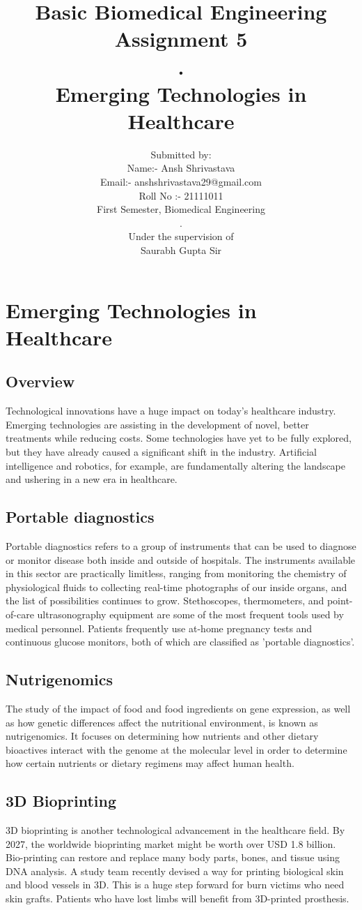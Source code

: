 \documentclass[12pt]{article}
\title{Basic Biomedical Engineering\\Assignment 5\\.\\Emerging Technologies in Healthcare}
\author{Submitted by: \\Name:- Ansh Shrivastava\\Email:- anshshrivastava29@gmail.com\\Roll No :- 21111011\\First Semester, Biomedical Engineering\\.\\Under the supervision of\\Saurabh Gupta Sir}
\begin{document}
\maketitle
\clearpage
\tableofcontents
\clearpage

\section{Emerging Technologies in Healthcare}
\subsection{Overview}
Technological innovations have a huge impact on today's healthcare industry. Emerging technologies are assisting in the development of novel, better treatments while reducing costs. Some technologies have yet to be fully explored, but they have already caused a significant shift in the industry. Artificial intelligence and robotics, for example, are fundamentally altering the landscape and ushering in a new era in healthcare.
\subsection{Portable diagnostics}
Portable diagnostics refers to a group of instruments that can be used to diagnose or monitor disease both inside and outside of hospitals. The instruments available in this sector are practically limitless, ranging from monitoring the chemistry of physiological fluids to collecting real-time photographs of our inside organs, and the list of possibilities continues to grow. Stethoscopes, thermometers, and point-of-care ultrasonography equipment are some of the most frequent tools used by medical personnel. Patients frequently use at-home pregnancy tests and continuous glucose monitors, both of which are classified as 'portable diagnostics'.
\subsection{Nutrigenomics}
The study of the impact of food and food ingredients on gene expression, as well as how genetic differences affect the nutritional environment, is known as nutrigenomics. It focuses on determining how nutrients and other dietary bioactives interact with the genome at the molecular level in order to determine how certain nutrients or dietary regimens may affect human health.
\subsection{3D Bioprinting}
3D bioprinting is another technological advancement in the healthcare field. By 2027, the worldwide bioprinting market might be worth over USD 1.8 billion. Bio-printing can restore and replace many body parts, bones, and tissue using DNA analysis. A study team recently devised a way for printing biological skin and blood vessels in 3D. This is a huge step forward for burn victims who need skin grafts. Patients who have lost limbs will benefit from 3D-printed prosthesis.
\end{document}
